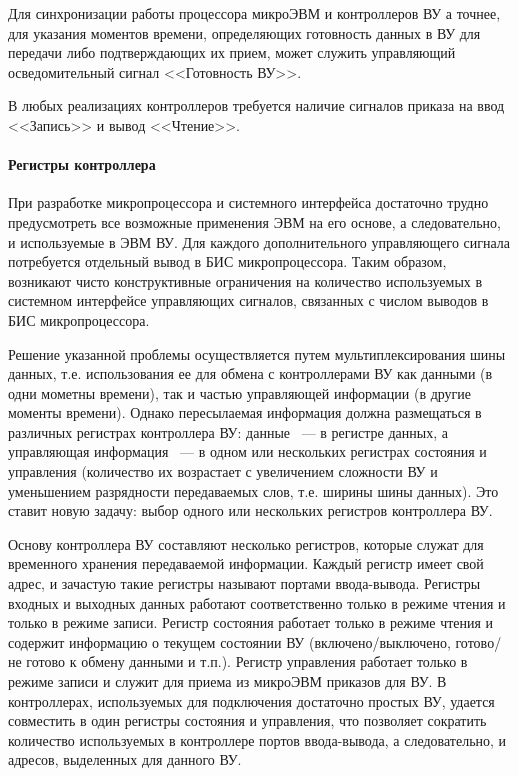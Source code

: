 \documentclass[10pt]{article}
\begin{document}
	Для синхронизации работы процессора микроЭВМ и контроллеров ВУ а точнее, для указания моментов времени, определяющих готовность данных в ВУ для передачи либо подтверждающих их прием, может служить управляющий осведомительный сигнал <<Готовность ВУ>>.

	В любых реализациях контроллеров требуется наличие сигналов приказа на ввод <<Запись>> и вывод <<Чтение>>.
	\paragraph{Регистры контроллера}
	При разработке микропроцессора и системного интерфейса достаточно трудно предусмотреть все возможные применения ЭВМ на его основе, а следовательно, и используемые в ЭВМ ВУ. Для каждого дополнительного управляющего сигнала потребуется отдельный вывод в БИС микропроцессора. Таким образом, возникают чисто конструктивные ограничения на количество используемых в системном интерфейсе управляющих сигналов, связанных с числом выводов в БИС микропроцессора.

	Решение указанной проблемы осуществляется путем мультиплексирования шины данных, т.е. использования ее для обмена с контроллерами ВУ как данными (в одни мометны времени), так и частью управляющей информации (в другие моменты времени). Однако пересылаемая информация должна размещаться в различных регистрах контроллера ВУ: данные ~--- в регистре данных, а управляющая информация ~--- в одном или нескольких регистрах состояния и управления (количество их возрастает с увеличением сложности ВУ и уменьшением разрядности передаваемых слов, т.е. ширины шины данных). Это ставит новую задачу: выбор одного или нескольких регистров контроллера ВУ.

	Основу контроллера ВУ составляют несколько регистров, которые служат для временного хранения передаваемой информации. Каждый регистр имеет свой адрес, и зачастую такие регистры называют портами ввода-вывода. Регистры входных и выходных данных работают соответственно только в режиме чтения и только в режиме записи. Регистр состояния работает только в режиме чтения и содержит информацию о текущем состоянии ВУ (включено/выключено, готово/не готово к обмену данными и т.п.). Регистр управления работает только в режиме записи и служит для приема из микроЭВМ приказов для ВУ. В контроллерах, используемых для подключения достаточно простых ВУ, удается совместить в один регистры состояния и управления, что позволяет сократить количество используемых в контроллере портов ввода-вывода, а следовательно, и адресов, выделенных для данного ВУ.
\end{document}
